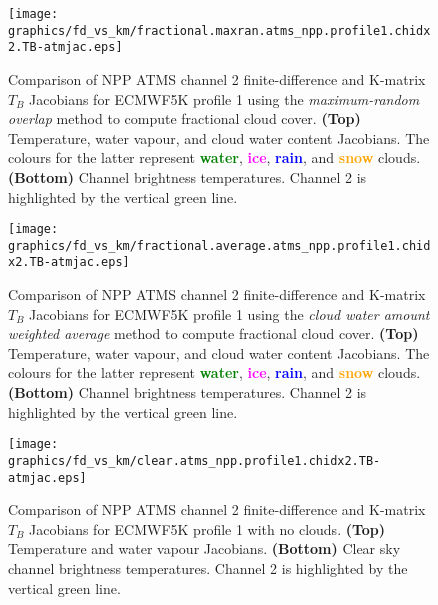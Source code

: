 \begin{figure}[H]
  \caption{Comparison of NPP ATMS channel 2 finite-difference and K-matrix $T_B$ Jacobians for ECMWF5K profile 1 using the \emph{maximum-random overlap} method to compute fractional cloud cover. \textbf{(Top)} Temperature, water vapour, and cloud water content Jacobians. The colours for the latter represent \textcolor{green}{\textbf{water}}, \textcolor{magenta}{\textbf{ice}}, \textcolor{blue}{\textbf{rain}}, and \textcolor{orange}{\textbf{snow}} clouds. \textbf{(Bottom)} Channel brightness temperatures. Channel 2 is highlighted by the vertical green line.}
  \label{fig:fractional.maxran.atms_npp.profile1.chidx2.TB-atmjac}
  \centering
  \texttt{[image: graphics/fd\_vs\_km/fractional.maxran.atms\_npp.profile1.chidx2.TB-atmjac.eps]}
\end{figure}


\begin{figure}[H]
  \caption{Comparison of NPP ATMS channel 2 finite-difference and K-matrix $T_B$ Jacobians for ECMWF5K profile 1 using the \emph{cloud water amount weighted average} method to compute fractional cloud cover. \textbf{(Top)} Temperature, water vapour, and cloud water content Jacobians. The colours for the latter represent \textcolor{green}{\textbf{water}}, \textcolor{magenta}{\textbf{ice}}, \textcolor{blue}{\textbf{rain}}, and \textcolor{orange}{\textbf{snow}} clouds. \textbf{(Bottom)} Channel brightness temperatures. Channel 2 is highlighted by the vertical green line.}
  \label{fig:fractional.average.atms_npp.profile1.chidx2.TB-atmjac}
  \centering
  \texttt{[image: graphics/fd\_vs\_km/fractional.average.atms\_npp.profile1.chidx2.TB-atmjac.eps]}
\end{figure}

\begin{figure}[H]
  \caption{Comparison of NPP ATMS channel 2 finite-difference and K-matrix $T_B$ Jacobians for ECMWF5K profile 1 with no clouds. \textbf{(Top)} Temperature and water vapour Jacobians. \textbf{(Bottom)} Clear sky channel brightness temperatures. Channel 2 is highlighted by the vertical green line.}
  \label{fig:clear.atms_npp.profile1.chidx2.TB-atmjac}
  \centering
  \texttt{[image: graphics/fd\_vs\_km/clear.atms\_npp.profile1.chidx2.TB-atmjac.eps]}
\end{figure}


